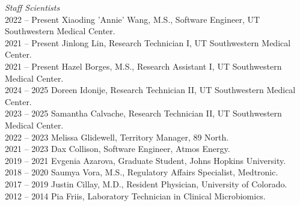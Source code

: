 \textit{Staff Scientists} \\
2022 -- Present \hspace{14pt} Xiaoding 'Annie' Wang, M.S., Software Engineer, UT Southwestern Medical Center. \\
2021 -- Present \hspace{14pt} Jinlong Lin, Research Technician I, UT Southwestern Medical Center. \\
2021 -- Present \hspace{14pt} Hazel Borges, M.S., Research Assistant I, UT Southwestern Medical Center. \\
2024 -- 2025 \hspace{28pt} Doreen Idonije, Research Technician II, UT Southwestern Medical Center. \\
2023 -- 2025 \hspace{28pt} Samantha Calvache, Research Technician II, UT Southwestern Medical Center. \\
2022 -- 2023 \hspace{28pt} Melissa Glidewell, Territory Manager, 89 North. \\
2021 -- 2023 \hspace{28pt} Dax Collison, Software Engineer, Atmos Energy. \\
2019 -- 2021 \hspace{28pt} Evgenia Azarova, Graduate Student, Johns Hopkins University. \\
2018 -- 2020 \hspace{28pt} Saumya Vora, M.S., Regulatory Affairs Specialist, Medtronic. \\
2017 -- 2019 \hspace{28pt} Justin Cillay, M.D., Resident Physician, University of Colorado. \\
2012 -- 2014 \hspace{28pt} Pia Friis,  Laboratory Technician in Clinical Microbiomics. \\


